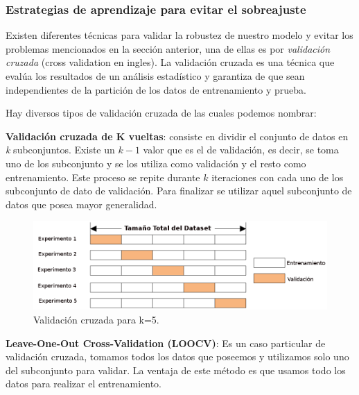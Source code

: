 \subsubsection{Estrategias de aprendizaje para evitar el sobreajuste}
Existen diferentes técnicas para validar la robustez de nuestro modelo y evitar los problemas mencionados en la sección anterior, una de ellas es por  \textit{validación cruzada} (cross validation en ingles). La validación cruzada es una técnica que evalúa los resultados de un análisis estadístico y garantiza de que sean independientes de la partición de los datos de entrenamiento y prueba. 

Hay diversos tipos de validación cruzada de las cuales podemos nombrar:


\par \textbf{Validación cruzada de K vueltas}: consiste en dividir el conjunto de datos en \textit{k} subconjuntos. Existe un $k-1 $ valor que es el de validación, es decir, se toma uno de los subconjunto y se los utiliza como validación y el resto como entrenamiento.  Este proceso se repite durante $k $ iteraciones con cada uno de los subconjunto de dato de validación. Para finalizar se utilizar aquel subconjunto de datos que posea mayor generalidad.
\begin{figure}[H]
 \centering
  \includegraphics[scale=0.4,keepaspectratio=true,clip=true]{imagenes/MarcoTeorico/crossvalidat.png}
  \caption{Validación cruzada para k=5.}%
	\label{Fig: crossvalidation}
\end{figure}

\par \textbf{Leave-One-Out Cross-Validation (LOOCV)}: Es un caso particular de validación cruzada, tomamos todos los datos que poseemos y utilizamos solo uno del subconjunto para validar. La ventaja de este método es que usamos todo los datos para realizar el entrenamiento.

